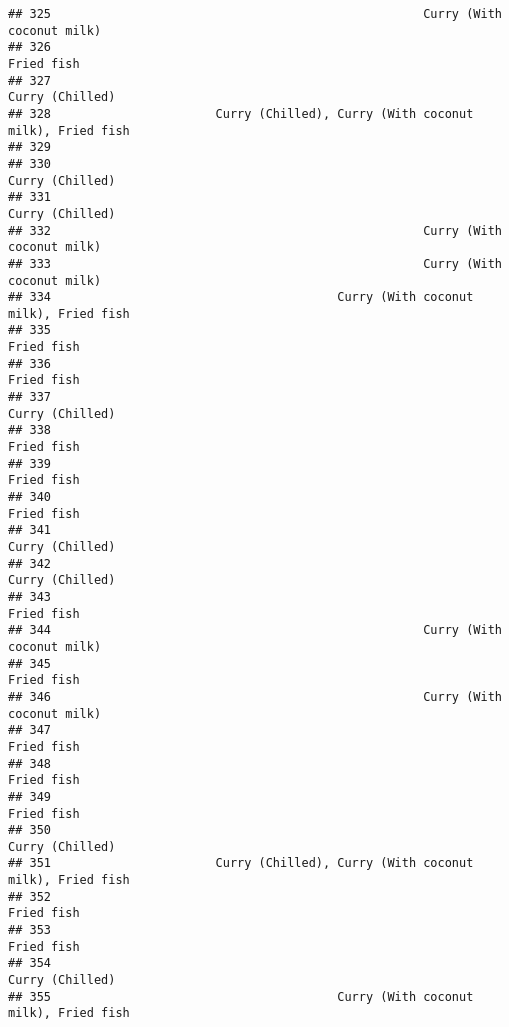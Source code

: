 \documentclass[
]{article}
\begin{document}
\begin{verbatim}
## 325                                                    Curry (With coconut milk)
## 326                                                                   Fried fish
## 327                                                              Curry (Chilled)
## 328                       Curry (Chilled), Curry (With coconut milk), Fried fish
## 329                                                                             
## 330                                                              Curry (Chilled)
## 331                                                              Curry (Chilled)
## 332                                                    Curry (With coconut milk)
## 333                                                    Curry (With coconut milk)
## 334                                        Curry (With coconut milk), Fried fish
## 335                                                                   Fried fish
## 336                                                                   Fried fish
## 337                                                              Curry (Chilled)
## 338                                                                   Fried fish
## 339                                                                   Fried fish
## 340                                                                   Fried fish
## 341                                                              Curry (Chilled)
## 342                                                              Curry (Chilled)
## 343                                                                   Fried fish
## 344                                                    Curry (With coconut milk)
## 345                                                                   Fried fish
## 346                                                    Curry (With coconut milk)
## 347                                                                   Fried fish
## 348                                                                   Fried fish
## 349                                                                   Fried fish
## 350                                                              Curry (Chilled)
## 351                       Curry (Chilled), Curry (With coconut milk), Fried fish
## 352                                                                   Fried fish
## 353                                                                   Fried fish
## 354                                                              Curry (Chilled)
## 355                                        Curry (With coconut milk), Fried fish

\end{verbatim}
\end{document}
